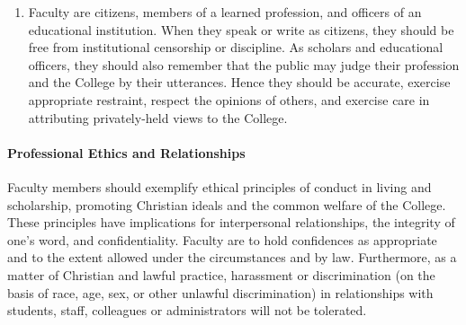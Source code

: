 \documentclass[letterpaper, 11pt]{article}
\begin{document}
\begin{enumerate}[label=\alph*)]
{\begin{enumerate}[label=\arabic*)]
							\item{Faculty are citizens, members of a learned profession, and officers of an educational institution.  When they speak or write as citizens, they should be free from institutional censorship or discipline.  As scholars and educational officers, they should also remember that the public may judge their profession and the College by their utterances.  Hence they should be accurate, exercise appropriate restraint, respect the opinions of others, and exercise care in attributing privately-held views to the College.}
						\end{enumerate}
					}
				\end{enumerate}
			\paragraph{Professional Ethics and Relationships}
				Faculty members should exemplify ethical principles of conduct in living and scholarship, promoting Christian ideals and the common welfare of the College.  These principles have implications for interpersonal relationships, the integrity of one's word, and confidentiality.  Faculty are to hold confidences as appropriate and to the extent allowed under the circumstances and by law.  Furthermore, as a matter of Christian and lawful practice, harassment or discrimination (on the basis of race, age, sex, or other unlawful discrimination) in relationships with students, staff, colleagues or administrators will not be tolerated.
\end{document}
